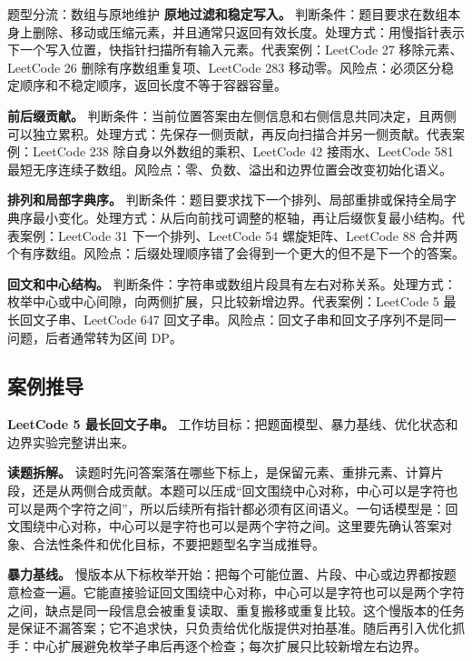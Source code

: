 \begin{principlebox}{题型分流：数组与原地维护}
\textbf{原地过滤和稳定写入。}
判断条件：题目要求在数组本身上删除、移动或压缩元素，并且通常只返回有效长度。处理方式：用慢指针表示下一个写入位置，快指针扫描所有输入元素。代表案例：LeetCode 27 移除元素、LeetCode 26 删除有序数组重复项、LeetCode 283 移动零。风险点：必须区分稳定顺序和不稳定顺序，返回长度不等于容器容量。

\textbf{前后缀贡献。}
判断条件：当前位置答案由左侧信息和右侧信息共同决定，且两侧可以独立累积。处理方式：先保存一侧贡献，再反向扫描合并另一侧贡献。代表案例：LeetCode 238 除自身以外数组的乘积、LeetCode 42 接雨水、LeetCode 581 最短无序连续子数组。风险点：零、负数、溢出和边界位置会改变初始化语义。

\textbf{排列和局部字典序。}
判断条件：题目要求找下一个排列、局部重排或保持全局字典序最小变化。处理方式：从后向前找可调整的枢轴，再让后缀恢复最小结构。代表案例：LeetCode 31 下一个排列、LeetCode 54 螺旋矩阵、LeetCode 88 合并两个有序数组。风险点：后缀处理顺序错了会得到一个更大的但不是下一个的答案。

\textbf{回文和中心结构。}
判断条件：字符串或数组片段具有左右对称关系。处理方式：枚举中心或中心间隙，向两侧扩展，只比较新增边界。代表案例：LeetCode 5 最长回文子串、LeetCode 647 回文子串。风险点：回文子串和回文子序列不是同一问题，后者通常转为区间 DP。

\end{principlebox}

\subsection{案例推导}

\noindent\textbf{LeetCode 5 最长回文子串。} 工作坊目标：把题面模型、暴力基线、优化状态和边界实验完整讲出来。

\textbf{读题拆解。} 读题时先问答案落在哪些下标上，是保留元素、重排元素、计算片段，还是从两侧合成贡献。本题可以压成“回文围绕中心对称，中心可以是字符也可以是两个字符之间”，所以后续所有指针都必须有区间语义。一句话模型是：回文围绕中心对称，中心可以是字符也可以是两个字符之间。这里要先确认答案对象、合法性条件和优化目标，不要把题型名字当成推导。

\textbf{暴力基线。} 慢版本从下标枚举开始：把每个可能位置、片段、中心或边界都按题意检查一遍。它能直接验证回文围绕中心对称，中心可以是字符也可以是两个字符之间，缺点是同一段信息会被重复读取、重复搬移或重复比较。这个慢版本的任务是保证不漏答案；它不追求快，只负责给优化版提供对拍基准。随后再引入优化抓手：中心扩展避免枚举子串后再逐个检查；每次扩展只比较新增左右边界。

